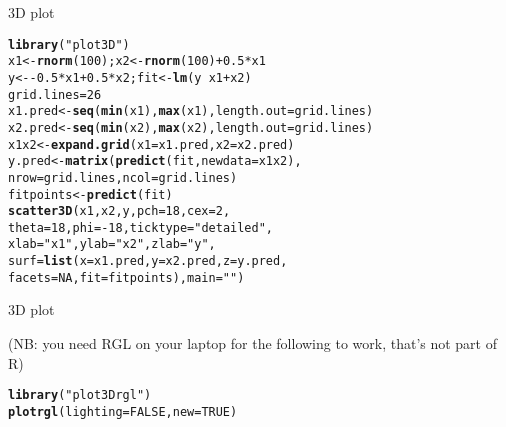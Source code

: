 \documentclass[10pt]{beamer}\usepackage[]{graphicx}\usepackage[]{color}
\makeatletter
\newcommand{\hlnum}[1]{\textcolor[rgb]{0.686,0.059,0.569}{#1}}%
\newcommand{\hlstr}[1]{\textcolor[rgb]{0.192,0.494,0.8}{#1}}%
\newcommand{\hlopt}[1]{\textcolor[rgb]{0,0,0}{#1}}%
\newcommand{\hlstd}[1]{\textcolor[rgb]{0.345,0.345,0.345}{#1}}%
\newcommand{\hlkwb}[1]{\textcolor[rgb]{0.69,0.353,0.396}{#1}}%
\newcommand{\hlkwc}[1]{\textcolor[rgb]{0.333,0.667,0.333}{#1}}%
\newcommand{\hlkwd}[1]{\textcolor[rgb]{0.737,0.353,0.396}{\textbf{#1}}}%
\newenvironment{kframe}{%
 \def\at@end@of@kframe{}%
 \ifinner\ifhmode%
  \def\at@end@of@kframe{\end{minipage}}%
  \begin{minipage}{\columnwidth}%
 \fi\fi%
 \def\FrameCommand##1{\hskip\@totalleftmargin \hskip-\fboxsep
 \colorbox{shadecolor}{##1}\hskip-\fboxsep
     \hskip-\linewidth \hskip-\@totalleftmargin \hskip\columnwidth}%
 \MakeFramed {\advance\hsize-\width
   \@totalleftmargin\z@ \linewidth\hsize
   \@setminipage}}%
 {\par\unskip\endMakeFramed%
 \at@end@of@kframe}
\newenvironment{knitrout}{}{} %
\makeatother
\begin{document}
\begin{frame}[fragile]{3D plot}
\begin{knitrout}
\color{fgcolor}\begin{kframe}
\begin{alltt}
\hlkwd{library}\hlstd{(}\hlstr{"plot3D"}\hlstd{)}
\hlstd{x1} \hlkwb{<-} \hlkwd{rnorm}\hlstd{(}\hlnum{100}\hlstd{) ; x2} \hlkwb{<-} \hlkwd{rnorm}\hlstd{(}\hlnum{100}\hlstd{)} \hlopt{+} \hlnum{0.5}\hlopt{*}\hlstd{x1}
\hlstd{y} \hlkwb{<-} \hlopt{-}\hlnum{0.5}\hlopt{*}\hlstd{x1} \hlopt{+} \hlnum{0.5}\hlopt{*}\hlstd{x2 ; fit} \hlkwb{<-} \hlkwd{lm}\hlstd{(y} \hlopt{~} \hlstd{x1} \hlopt{+} \hlstd{x2)}
\hlstd{grid.lines} \hlkwb{=} \hlnum{26}
\hlstd{x1.pred} \hlkwb{<-} \hlkwd{seq}\hlstd{(}\hlkwd{min}\hlstd{(x1),} \hlkwd{max}\hlstd{(x1),} \hlkwc{length.out} \hlstd{= grid.lines)}
\hlstd{x2.pred} \hlkwb{<-} \hlkwd{seq}\hlstd{(}\hlkwd{min}\hlstd{(x2),} \hlkwd{max}\hlstd{(x2),} \hlkwc{length.out} \hlstd{= grid.lines)}
\hlstd{x1x2} \hlkwb{<-} \hlkwd{expand.grid}\hlstd{(} \hlkwc{x1} \hlstd{= x1.pred,} \hlkwc{x2} \hlstd{= x2.pred)}
\hlstd{y.pred} \hlkwb{<-} \hlkwd{matrix}\hlstd{(}\hlkwd{predict}\hlstd{(fit,} \hlkwc{newdata} \hlstd{= x1x2),}
\hlkwc{nrow} \hlstd{= grid.lines,} \hlkwc{ncol} \hlstd{= grid.lines)}
\hlstd{fitpoints} \hlkwb{<-} \hlkwd{predict}\hlstd{(fit)}
\hlkwd{scatter3D}\hlstd{(x1, x2, y,} \hlkwc{pch} \hlstd{=} \hlnum{18}\hlstd{,} \hlkwc{cex} \hlstd{=} \hlnum{2}\hlstd{,}
\hlkwc{theta} \hlstd{=}\hlnum{18}\hlstd{,} \hlkwc{phi} \hlstd{=} \hlopt{-}\hlnum{18}\hlstd{,} \hlkwc{ticktype} \hlstd{=} \hlstr{"detailed"}\hlstd{,}
\hlkwc{xlab} \hlstd{=} \hlstr{"x1"}\hlstd{,} \hlkwc{ylab} \hlstd{=} \hlstr{"x2"}\hlstd{,} \hlkwc{zlab} \hlstd{=} \hlstr{"y"}\hlstd{,}
\hlkwc{surf} \hlstd{=} \hlkwd{list}\hlstd{(}\hlkwc{x} \hlstd{= x1.pred,} \hlkwc{y} \hlstd{= x2.pred,} \hlkwc{z} \hlstd{= y.pred,}
\hlkwc{facets} \hlstd{=} \hlnum{NA}\hlstd{,} \hlkwc{fit} \hlstd{= fitpoints),} \hlkwc{main} \hlstd{=} \hlstr{""}\hlstd{)}
\end{alltt}
\end{kframe}
\end{knitrout}
\end{frame}

\begin{frame}[fragile]{3D plot}

(NB: you need RGL on your laptop for the following to work, that's not part of R)

\begin{knitrout}
\color{fgcolor}\begin{kframe}
\begin{alltt}
\hlkwd{library}\hlstd{(}\hlstr{"plot3Drgl"}\hlstd{)}
\hlkwd{plotrgl}\hlstd{(}\hlkwc{lighting} \hlstd{=} \hlnum{FALSE}\hlstd{,} \hlkwc{new}\hlstd{=}\hlnum{TRUE}\hlstd{)}
\end{alltt}
\end{kframe}
\end{knitrout}

\end{frame}
\end{document}
